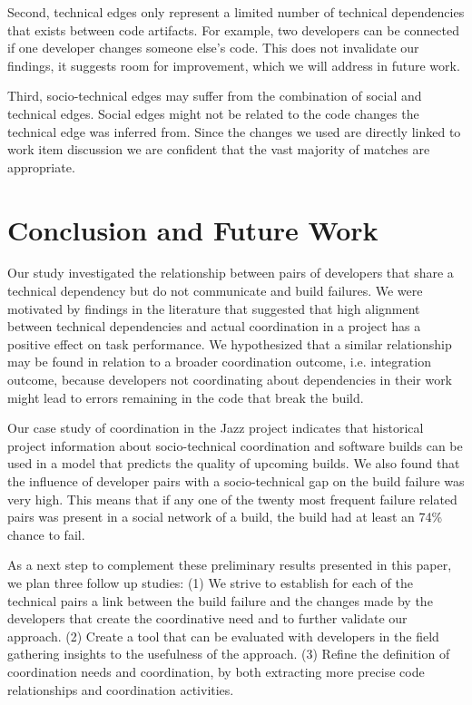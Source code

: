 \documentclass[conference]{IEEEtran}
\begin{document}
Second, technical edges only represent a limited number of technical dependencies that exists between code artifacts. 
For example, two developers can be connected if one developer changes someone else's code. 
This does not invalidate our findings, it suggests room for improvement, which we will address in future work.

Third, socio-technical edges may suffer from the combination of social and technical edges. 
Social edges might not be related to the code changes the technical edge was inferred from.
Since the changes we used are directly linked to work item discussion we are confident that the vast majority of matches are appropriate.


\section{Conclusion and Future Work}
Our study investigated the relationship between pairs of developers that share
a technical dependency but do not communicate and build failures. We were
motivated by findings in the literature that suggested that high alignment between technical dependencies and actual coordination in a project has a positive effect on task
performance.
We hypothesized that a similar relationship may be found in relation to a broader
coordination outcome, i.e. integration outcome, because developers not
coordinating about dependencies in their work might lead to errors remaining in
the code that break the build.

Our case study of coordination in the Jazz project indicates that 
historical project information about socio-technical coordination and software
builds can be used in a model that predicts the quality of upcoming builds. We also found
that the influence of developer pairs with a socio-technical gap on the build
failure was very high. This means that if any one of the twenty most frequent failure related pairs was present in a social network of a build, the build had at least an 74\% chance to fail.

As a next step to complement these preliminary results presented in this paper, we plan three follow up studies:
(1) We strive to establish for each of the technical pairs a link between the build failure and the changes made by the developers that create the coordinative need and to further validate our approach.
(2) Create a tool that can be evaluated with developers in the field gathering insights to the usefulness of the approach.
(3) Refine the definition of coordination needs and coordination, by both extracting more precise code relationships and coordination activities.



\end{document}
